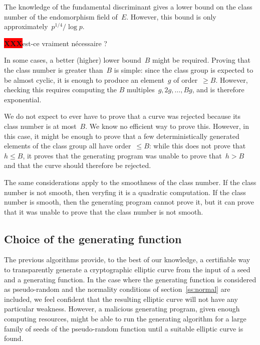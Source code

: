 \documentclass{article}
\def\XXX{{\colorbox{red}{{\color{white}\bfseries XXX}}}}
\begin{document}
The knowledge of the fundamental discriminant gives a lower bound
on the class number of the endomorphism field of~$E$.
However, this bound is only approximately~$p^{1/4}/\log p$.

\smallskip

\XXX est-ce vraiment nécessaire ?

In some cases, a better (higher) lower bound~$B$ might be required.
Proving that the class number is greater than~$B$ is simple:
since the class group is expected to be almost cyclic,
it is enough to produce an element~$g$ of order~$≥ B$.
However, checking this requires
computing the $B$ multiples~$g, 2g, …, B g$,
and is therefore exponential.

We do not expect to ever have to prove that a curve was rejected
because its class number is at most~$B$.
We know no efficient way to prove this.
However, in this case, it might be enough to prove
that a few deterministically generated elements of the class group
all have order~$≤ B$:
while this does not prove that~$h ≤ B$,
it proves that the generating program was unable to prove that~$h > B$
and that the curve should therefore be rejected.

\smallskip

The same considerations apply to the smoothness of the class number.
If the class number is not smooth, then
veryfing it is a quadratic computation.
If the class number is smooth, then
the generating program cannot prove it,
but it can prove that it was unable to prove that
the class number is not smooth.




\subsection{Choice of the generating function}

The previous algorithms provide, to the best of our knowledge,
a certifiable way to transparently generate a cryptographic elliptic curve
from the input of a seed and a generating function.
In the case where the generating function is considered as pseudo-random
and the normality conditions of section~\ref{ss:normal} are included,
we feel confident that the resulting elliptic curve
will not have any particular weakness.
However, a malicious generating program, given enough computing resources,
might be able to run the generating algorithm
for a large family of seeds of the pseudo-random function
until a suitable elliptic curve is found.
\end{document}
